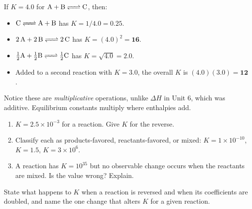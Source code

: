 \documentclass{apchem-notes}
\begin{document}
\begin{workedexample}
If $K = 4.0$ for $\ce{A + B <=> C}$, then:

\begin{itemize}[leftmargin=*,itemsep=0.2em]
  \item $\ce{C <=> A + B}$ has $K = 1/4.0 = \mathbf{0.25}$.
  \item $\ce{2A + 2B <=> 2C}$ has $K = (4.0)^2 = \mathbf{16}$.
  \item $\ce{\tfrac{1}{2}A + \tfrac{1}{2}B <=> \tfrac{1}{2}C}$ has
        $K = \sqrt{4.0} = \mathbf{2.0}$.
  \item Added to a second reaction with $K = 3.0$, the overall $K$ is
        $(4.0)(3.0) = \mathbf{12}$.
\end{itemize}

Notice these are \emph{multiplicative} operations, unlike $\Delta H$ in
Unit 6, which was additive. Equilibrium constants multiply where enthalpies
add.
\end{workedexample}


\begin{enumerate}[leftmargin=*,itemsep=0.4em]
  \item $K = 2.5\times10^{-3}$ for a reaction. Give $K$ for the reverse.
  \item Classify each as products-favored, reactants-favored, or mixed:
        $K = 1\times10^{-10}$, $K = 1.5$, $K = 3\times10^{6}$.
  \item A reaction has $K = 10^{35}$ but no observable change occurs when
        the reactants are mixed. Is the value wrong? Explain.
\end{enumerate}

\begin{exitticket}
State what happens to $K$ when a reaction is reversed and when its
coefficients are doubled, and name the one change that alters $K$ for a
given reaction.
\end{exitticket}
\end{document}

